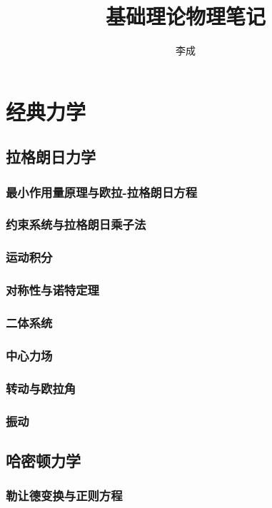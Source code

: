 \documentclass[a4paper]{report}
\author{李成}
\title{\textbf{{\Huge 基础理论物理笔记}}}
\begin{document}
\maketitle
\tableofcontents
\part{经典力学}
\chapter{拉格朗日力学}
\section{最小作用量原理与欧拉-拉格朗日方程}
\section{约束系统与拉格朗日乘子法}
\section{运动积分}
\section{对称性与诺特定理}
\section{二体系统}
\section{中心力场}
\section{转动与欧拉角}
\section{振动}
\chapter{哈密顿力学}
\section{勒让德变换与正则方程}
\end{document}
